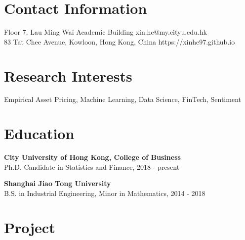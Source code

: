 \documentclass[margin]{res}
\begin{document}
\begin{resume}


%

\section{\sc Contact Information}
	Floor 7, Lau Ming Wai Academic Building	   \hfill xin.he@my.cityu.edu.hk\\        
	83 Tat Chee Avenue, Kowloon, Hong Kong, China 	\hfill   https://xinhe97.github.io \\

\section{\sc Research Interests}
{Empirical Asset Pricing, Machine Learning, Data Science, FinTech, Sentiment}

\vspace{5mm}

\section{\sc Education}
\textbf{City University of Hong Kong, College of Business}\\
{Ph.D. Candidate in Statistics and Finance, 2018 - present}

\textbf{Shanghai Jiao Tong University}\\
{B.S. in Industrial Engineering, Minor in Mathematics, 2014 - 2018}


\section{\sc Project}


\end{resume}
\end{document}
